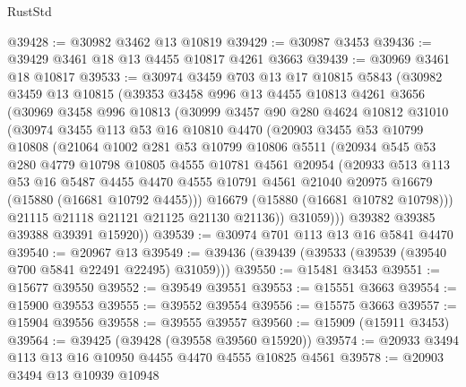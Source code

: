 \begin{lexlean}{RustStd}
\begin{coremodule}
@39428 := @30982 @3462 @13 @10819
@39429 := @30987 @3453
@39436 := @39429 @3461 @18 @13 @4455 @10817 @4261 @3663
@39439 := @30969 @3461 @18 @10817
@39533 := @30974
    @3459
    @703
    @13
    @17
    @10815
    @5843
    (@30982
      @3459
      @13
      @10815
      (@39353
        @3458
        @996
        @13
        @4455
        @10813
        @4261
        @3656
        (@30969
          @3458
          @996
          @10813
          (@30999
            @3457
            @90
            @280
            @4624
            @10812
            @31010
            (@30974
              @3455
              @113
              @53
              @16
              @10810
              @4470
              (@20903
                @3455
                @53
                @10799
                @10808
                (@21064
                  @1002
                  @281
                  @53
                  @10799
                  @10806
                  @5511
                  (@20934
                    @545
                    @53
                    @280
                    @4779
                    @10798
                    @10805
                    @4555
                    @10781
                    @4561
                    @20954
                    (@20933
                      @513
                      @113
                      @53
                      @16
                      @5487
                      @4455
                      @4470
                      @4555
                      @10791
                      @4561
                      @21040
                      @20975
                      @16679
                      (@15880 (@16681 @10792 @4455)))
                    @16679
                    (@15880 (@16681 @10782 @10798)))
                  @21115
                  @21118
                  @21121
                  @21125
                  @21130
                  @21136))
              @31059)))
        @39382
        @39385
        @39388
        @39391
        @15920))
@39539 := @30974 @701 @113 @13 @16 @5841 @4470
@39540 := @20967 @13
@39549 := @39436 (@39439 (@39533 (@39539 (@39540 @700 @5841 @22491 @22495) @31059)))
@39550 := @15481 @3453
@39551 := @15677 @39550
@39552 := @39549 @39551
@39553 := @15551 @3663
@39554 := @15900 @39553
@39555 := @39552 @39554
@39556 := @15575 @3663
@39557 := @15904 @39556
@39558 := @39555 @39557
@39560 := @15909 (@15911 @3453)
@39564 := @39425 (@39428 (@39558 @39560 @15920))
@39574 := @20933 @3494 @113 @13 @16 @10950 @4455 @4470 @4555 @10825 @4561
@39578 := @20903 @3494 @13 @10939 @10948

\end{coremodule}
\end{lexlean}
